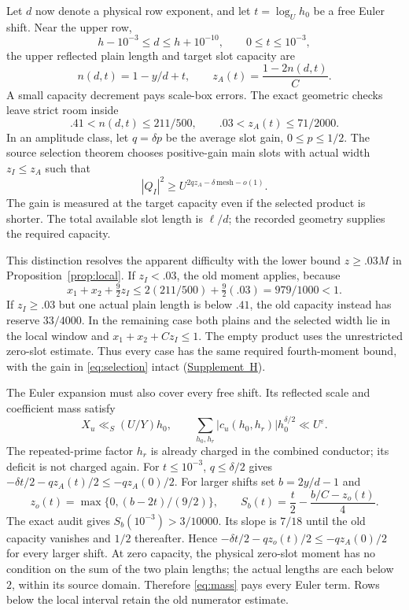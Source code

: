 \documentclass[11pt]{article}
\newcommand{\eps}{\varepsilon}
\newcommand{\supp}[1]{\href{supplement.pdf}{Supplement~#1}}
\begin{document}
Let $d$ now denote a physical row exponent, and let $t=\log_U h_0$
be a free Euler shift. Near the upper row,
\[
 h-10^{-3}\le d\le h+10^{-10},\qquad 0\le t\le10^{-3},
\]
the upper reflected plain length and target slot capacity are
\[
 n(d,t)=1-y/d+t,\qquad z_A(t)=\frac{1-2n(d,t)}C.
\]
A small capacity decrement pays scale-box errors. The exact geometric
checks leave strict room inside
\[
 .41<n(d,t)\le211/500,
 \qquad .03<z_A(t)\le71/2000.
\]
In an amplitude class, let $q=\delta p$ be the average slot gain,
$0\le p\le1/2$. The source selection theorem chooses positive-gain
main slots with actual width $z_I\le z_A$ such that
\begin{equation}\label{eq:selection}
 |Q_I|^2\ge U^{2qz_A-\delta\,\mathrm{mesh}-o(1)}.
\end{equation}
The gain is measured at the target capacity even if the selected
product is shorter. The total available slot length is $\ell/d$;
the recorded geometry supplies the required capacity.

This distinction resolves the apparent difficulty with the lower
bound $z\ge.03M$ in Proposition~\ref{prop:local}. If $z_I<.03$, the
old moment applies, because
\[
 x_1+x_2+\tfrac92z_I
 \le2(211/500)+\tfrac92(.03)=979/1000<1.
\]
If $z_I\ge.03$ but one actual plain length is below $.41$, the old
capacity instead has reserve $33/4000$. In the remaining case both
plains and the selected width lie in the local window and
$x_1+x_2+Cz_I\le1$. The empty product uses the unrestricted zero-slot
estimate. Thus every case has the same required fourth-moment bound,
with the gain in \eqref{eq:selection} intact (\supp{H}).

The Euler expansion must also cover every free shift. Its reflected
scale and coefficient mass satisfy
\begin{equation}\label{eq:mass}
 X_u\ll_S(U/Y)h_0,\qquad
 \sum_{h_0,h_r}|c_u(h_0,h_r)|h_0^{\delta/2}\ll U^\eps.
\end{equation}
The repeated-prime factor $h_r$ is already charged in the combined
conductor; its deficit is not charged again. For $t\le10^{-3}$,
$q\le\delta/2$ gives
$-\delta t/2-qz_A(t)/2\le-qz_A(0)/2$.
For larger shifts set $b=2y/d-1$ and
\[
 z_o(t)=\max\{0,(b-2t)/(9/2)\},\qquad
 S_b(t)=\frac t2-\frac{b/C-z_o(t)}4.
\]
The exact audit gives $S_b(10^{-3})>3/10000$. Its slope is $7/18$
until the old capacity vanishes and $1/2$ thereafter. Hence
$-\delta t/2-qz_o(t)/2\le-qz_A(0)/2$ for every larger shift.
At zero capacity, the physical zero-slot moment has no condition on
the sum of the two plain lengths; the actual lengths are each below
$2$, within its source domain. Therefore \eqref{eq:mass} pays every
Euler term. Rows below the local interval retain the old numerator
estimate.
\end{document}
